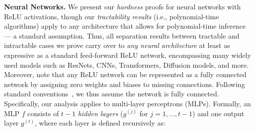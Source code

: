 \documentclass{article}
\newcommand{\x}{\textbf{x}}
\begin{document}

\textbf{Neural Networks.} We present our \emph{hardness} proofs for neural networks with ReLU activations, though our \emph{tractability results} (i.e., polynomial-time algorithms) apply to any architecture that allows for polynomial-time inference --- a standard assumption. Thus, all separation results between tractable and intractable cases we prove carry over to \emph{any neural architecture} at least as expressive as a standard feed-forward ReLU network, encompassing many widely used models such as ResNets, CNNs, Transformers, Diffusion models, and more. Moreover, note that any ReLU network can be represented as a fully connected network by assigning zero weights and biases to missing connections. Following standard conventions~\citep{BaMoPeSu20, bassanlocal, adolfi2024computational}, we thus assume the network is fully connected. Specifically, our analysis applies to multi-layer perceptrons (MLPs). Formally, an MLP $f$ consists of $t-1$ \emph{hidden layers} ($g^{(j)}$ for $j = 1,\ldots,t-1$) and one output layer $g^{(t)}$, where each layer is defined recursively as:


\end{document}
